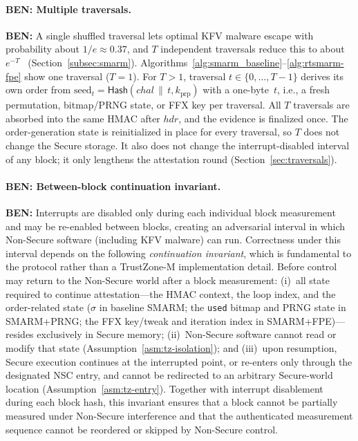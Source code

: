 \documentclass{ieeeaccess}
\DeclareRobustCommand{\ben}[1]{{\color{BENcolor}\textbf{BEN:} #1}}
\newcommand{\rtsmarmone}{SMARM+PRNG\xspace}
\newcommand{\rtsmarmtwo}{SMARM+FPE\xspace}
\begin{document}
\paragraph{\ben{Multiple traversals.}}
\ben{A single shuffled traversal lets optimal KFV malware escape with probability about $1/e \approx 0.37$, and $T$ independent traversals reduce this to about $e^{-T}$~\cite{smarm} (Section~\ref{subsec:smarm}).
Algorithms~\ref{alg:smarm_baseline}--\ref{alg:rtsmarm-fpe} show one traversal ($T = 1$).
For $T > 1$, traversal $t \in \{0,\ldots,T-1\}$ derives its own order from $\text{seed}_t = \mathsf{Hash}(chal \,\|\, t, k_{\mathrm{prp}})$ with a one-byte~$t$, i.e., a fresh permutation, bitmap/PRNG state, or FFX key per traversal.
All $T$ traversals are absorbed into the same HMAC after $\mathit{hdr}$, and the evidence is finalized once.
The order-generation state is reinitialized in place for every traversal, so $T$ does not change the Secure storage.
It also does not change the interrupt-disabled interval of any block; it only lengthens the attestation round (Section~\ref{sec:traversals}).}

\paragraph{\ben{Between-block continuation invariant.}}
\ben{Interrupts are disabled only during each individual block measurement and may be re-enabled between blocks, creating an adversarial interval in which Non-Secure software (including KFV malware) can run.
Correctness under this interval depends on the following \emph{continuation invariant}, which is fundamental to the protocol rather than a TrustZone-M implementation detail.
Before control may return to the Non-Secure world after a block measurement: (i)~all state required to continue attestation---the HMAC context, the loop index, and the order-related state ($\sigma$ in baseline SMARM; the \texttt{used} bitmap and PRNG state in \rtsmarmone; the FFX key/tweak and iteration index in \rtsmarmtwo)---resides exclusively in Secure memory; (ii)~Non-Secure software cannot read or modify that state (Assumption~\ref{asm:tz-isolation}); and (iii)~upon resumption, Secure execution continues at the interrupted point, or re-enters only through the designated NSC entry, and cannot be redirected to an arbitrary Secure-world location (Assumption~\ref{asm:tz-entry}).
Together with interrupt disablement during each block hash, this invariant ensures that a block cannot be partially measured under Non-Secure interference and that the authenticated measurement sequence cannot be reordered or skipped by Non-Secure control.}
\end{document}
